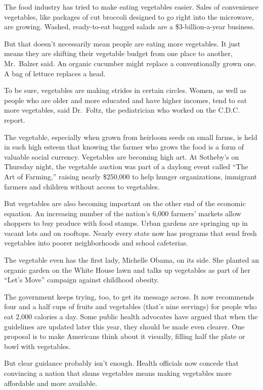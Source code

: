 ﻿\documentclass[12pt]{article}
\begin{document}
The food industry has tried to make eating vegetables easier. Sales of convenience vegetables, like
packages of cut broccoli designed to go right into the microwave, are growing. Washed, ready-to-eat
bagged salads are a \$3-billion-a-year business.

But that doesn't necessarily mean people are eating more vegetables. It just means they are shifting
their vegetable budget from one place to another, Mr.~Balzer said. An organic cucumber might replace
a conventionally grown one. A bag of lettuce replaces a head.

To be sure, vegetables are making strides in certain circles. Women, as well as people who are older
and more educated and have higher incomes, tend to eat more vegetables, said Dr.~Foltz, the
pediatrician who worked on the C.D.C. report.

The vegetable, especially when grown from heirloom seeds on small farms, is held in such high esteem
that knowing the farmer who grows the food is a form of valuable social currency. Vegetables are
becoming high art. At Sotheby's on Thursday night, the vegetable auction was part of a daylong event
called ``The Art of Farming,'' raising nearly \$250,000 to help hunger organizations, immigrant
farmers and children without access to vegetables.

But vegetables are also becoming important on the other end of the economic equation. An increasing
number of the nation's 6,000 farmers' markets allow shoppers to buy produce with food stamps. Urban
gardens are springing up in vacant lots and on rooftops. Nearly every state now has programs that
send fresh vegetables into poorer neighborhoods and school cafeterias.

The vegetable even has the first lady, Michelle Obama, on its side. She planted an organic garden on
the White House lawn and talks up vegetables as part of her ``Let's Move'' campaign against
childhood obesity.

The government keeps trying, too, to get its message across. It now recommends four and a half cups
of fruits and vegetables (that's nine servings) for people who eat 2,000 calories a day. Some public
health advocates have argued that when the guidelines are updated later this year, they should be
made even clearer. One proposal is to make Americans think about it visually, filling half the plate
or bowl with vegetables.

But clear guidance probably isn't enough. Health officials now concede that convincing a nation that
shuns vegetables means making vegetables more affordable and more available.
\end{document}
